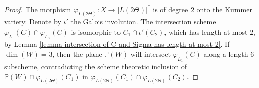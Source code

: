 \documentclass[12pt]{amsart}
\numberwithin{equation}{subsection}
\theoremstyle{plain}
\theoremstyle{definition}
\newcommand{\PP}{{\mathbb P}}
\begin{document}
{\begin{proof}
The morphism $\varphi_{L(2\Theta)}:X\rightarrow |L(2\Theta)|^*$ is of degree $2$ onto the Kummer variety. 
Denote by $\iota'$ the Galois involution. The intersection scheme $\varphi_{L_1}(C)\cap \varphi_{L_2}(C)$
is isomorphic to $C_1\cap \iota'(C_2)$, which has length at most $2$, by Lemma \ref{lemma-intersection-of-C-and-Sigma-has-length-at-most-2}. 
If $\dim(W)=3$, then the plane $\PP(W)$ will intersect $\varphi_{L_1}(C)$ along a length $6$ subscheme, contradicting the scheme theoretic inclusion of $\PP(W)\cap \varphi_{L(2\Theta)}(C_1)$ in $\varphi_{L(2\Theta)}(C_1)\cap \varphi_{L(2\Theta)}(C_2)$.
\end{proof}
}


\end{document}

